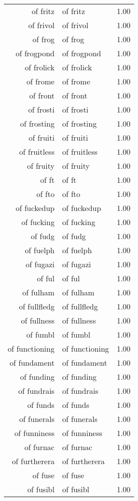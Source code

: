 \begin{table}[ht]
\begin{tabular}{rlr}
  of fritz & of fritz & 1.00 \\ 
  of frivol & of frivol & 1.00 \\ 
  of frog & of frog & 1.00 \\ 
  of frogpond & of frogpond & 1.00 \\ 
  of frolick & of frolick & 1.00 \\ 
  of frome & of frome & 1.00 \\ 
  of front & of front & 1.00 \\ 
  of frosti & of frosti & 1.00 \\ 
  of frosting & of frosting & 1.00 \\ 
  of fruiti & of fruiti & 1.00 \\ 
  of fruitless & of fruitless & 1.00 \\ 
  of fruity & of fruity & 1.00 \\ 
  of ft & of ft & 1.00 \\ 
  of fto & of fto & 1.00 \\ 
  of fuckedup & of fuckedup & 1.00 \\ 
  of fucking & of fucking & 1.00 \\ 
  of fudg & of fudg & 1.00 \\ 
  of fuelph & of fuelph & 1.00 \\ 
  of fugazi & of fugazi & 1.00 \\ 
  of ful & of ful & 1.00 \\ 
  of fulham & of fulham & 1.00 \\ 
  of fullfledg & of fullfledg & 1.00 \\ 
  of fullness & of fullness & 1.00 \\ 
  of fumbl & of fumbl & 1.00 \\ 
  of functioning & of functioning & 1.00 \\ 
  of fundament & of fundament & 1.00 \\ 
  of funding & of funding & 1.00 \\ 
  of fundrais & of fundrais & 1.00 \\ 
  of funds & of funds & 1.00 \\ 
  of funerals & of funerals & 1.00 \\ 
  of funniness & of funniness & 1.00 \\ 
  of furnac & of furnac & 1.00 \\ 
  of furtherera & of furtherera & 1.00 \\ 
  of fuse & of fuse & 1.00 \\ 
  of fusibl & of fusibl & 1.00 \\ 

\end{tabular}
\end{table}
